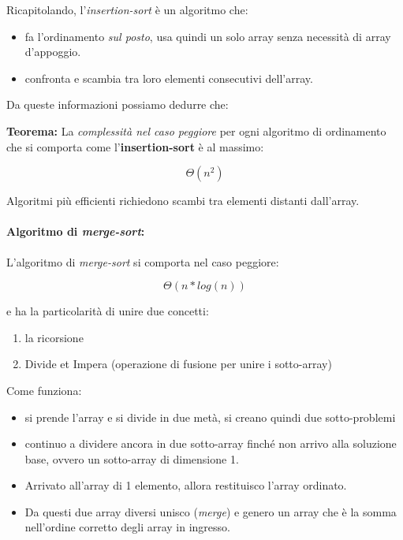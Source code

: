 \documentclass[
]{article}
\begin{document}
Ricapitolando, l'\emph{insertion-sort} è un algoritmo che:

\begin{itemize}
\item
  fa l'ordinamento \emph{sul posto}, usa quindi un solo array senza
  necessità di array d'appoggio.
\item
  confronta e scambia tra loro elementi consecutivi dell'array.
\end{itemize}

Da queste informazioni possiamo dedurre che:

\textbf{Teorema:} La \emph{complessità nel caso peggiore} per ogni
algoritmo di ordinamento che si comporta come l'\textbf{insertion-sort}
è al massimo:

\[Θ(n^2)\]

Algoritmi più efficienti richiedono scambi tra elementi distanti
dall'array.

\hypertarget{header-n1681}{%
\paragraph{\texorpdfstring{Algoritmo di
\emph{merge-sort}:}{Algoritmo di merge-sort:}}\label{header-n1681}}

L'algoritmo di \emph{merge-sort} si comporta nel caso peggiore:

\[Θ(n * log(n))\]

e ha la particolarità di unire due concetti:

\begin{enumerate}
\def\labelenumi{\arabic{enumi}.}
\item
  la ricorsione
\item
  Divide et Impera (operazione di fusione per unire i sotto-array)
\end{enumerate}

Come funziona:

\begin{itemize}
\item
  si prende l'array e si divide in due metà, si creano quindi due
  sotto-problemi
\item
  continuo a dividere ancora in due sotto-array finché non arrivo alla
  soluzione base, ovvero un sotto-array di dimensione 1.
\item
  Arrivato all'array di 1 elemento, allora restituisco l'array ordinato.
\item
  Da questi due array diversi unisco (\emph{merge}) e genero un array
  che è la somma nell'ordine corretto degli array in ingresso.
\end{itemize}
\end{document}
